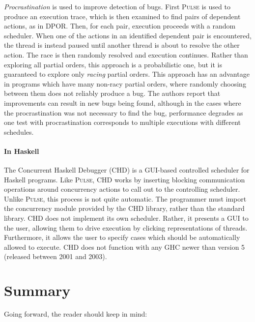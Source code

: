 \emph{Procrastination}\cite{sen2008} is used to improve detection of
bugs.  First \textsc{Pulse} is used to produce an execution trace,
which is then examined to find pairs of dependent actions, as in DPOR.
Then, for each pair, execution proceeds with a random scheduler.  When
one of the actions in an identified dependent pair is encountered, the
thread is instead paused until another thread is about to resolve the
other action.  The race is then randomly resolved and execution
continues.  Rather than exploring all partial orders, this approach is
a probabilistic one, but it is guaranteed to explore only
\emph{racing} partial orders.  This approach has an advantage in
programs which have many non-racy partial orders, where randomly
choosing between them does not reliably produce a bug.  The authors
report that improvements can result in new bugs being found, although
in the cases where the procrastination was not necessary to find the
bug, performance degrades\cite{arts2011} as one test with
procrastination corresponds to multiple executions with different
schedules.

\paragraph{In Haskell}
The Concurrent Haskell Debugger (CHD)\cite{bottcher2002} is a
GUI-based controlled scheduler for Haskell programs.  Like
\textsc{Pulse}, CHD works by inserting blocking communication
operations around concurrency actions to call out to the controlling
scheduler.  Unlike \textsc{Pulse}, this process is not quite
automatic.  The programmer must import the concurrency module provided
by the CHD library, rather than the standard library.  CHD does not
implement its own scheduler.  Rather, it presents a GUI to the user,
allowing them to drive execution by clicking representations of
threads.  Furthermore, it allows the user to specify cases which
should be automatically allowed to execute.  CHD does not function
with any GHC newer than version 5 (released between 2001 and 2003).

\section{Summary}

Going forward, the reader should keep in mind:


